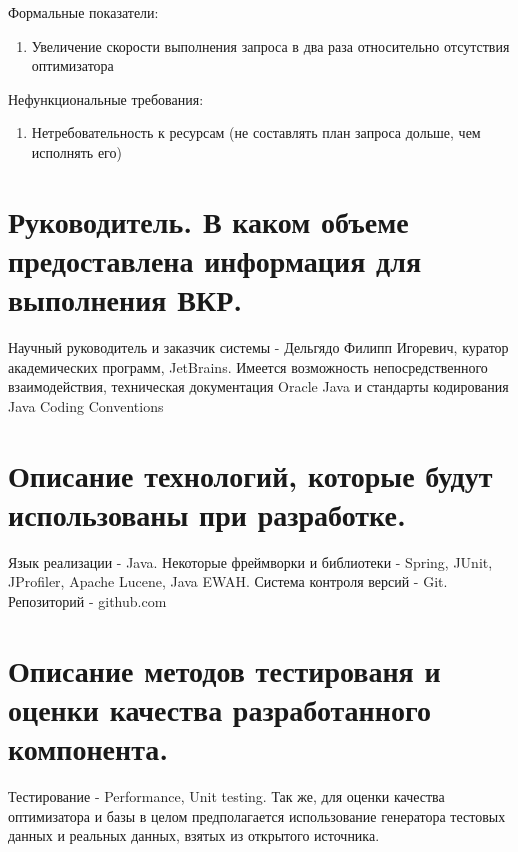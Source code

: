 \documentclass[12pt]{article}
\begin{document}
        Формальные показатели: %
        \begin{enumerate}\itemsep1pt \parskip0pt  
            \item Увеличение скорости выполнения запроса в два раза относительно отсутствия оптимизатора
        \end{enumerate}
        
        Нефункциональные требования: %
        \begin{enumerate}\itemsep1pt \parskip0pt  
            \item Нетребовательность к ресурсам (не составлять план запроса дольше, чем исполнять его)
        \end{enumerate}
    \section{Руководитель. В каком объеме предоставлена информация для выполнения ВКР.}
        Научный руководитель и заказчик системы - Дельгядо Филипп Игоревич, куратор академических программ, JetBrains. Имеется возможность непосредственного взаимодействия, техническая документация Oracle Java и стандарты кодирования Java Coding Conventions
    \section{Описание технологий, которые будут использованы при разработке.}
        Язык реализации - Java. Некоторые фреймворки и библиотеки - Spring, JUnit, JProfiler, Apache Lucene, Java EWAH. Система контроля версий - Git. Репозиторий - github.com 
    \section{Описание методов тестированя и оценки качества разработанного компонента.}
        Тестирование - Performance, Unit testing. Так же, для оценки качества оптимизатора и базы в целом предполагается использование генератора тестовых данных и реальных данных, взятых из открытого источника.
\end{document}
